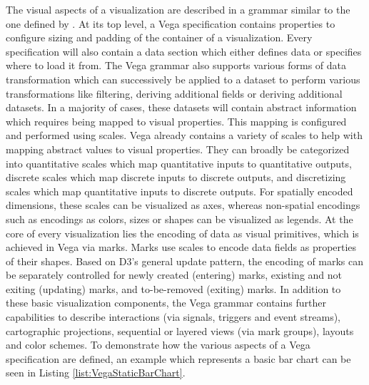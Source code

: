 The visual aspects of a visualization are described in a grammar similar to the one defined by \cite{GrammarOfGraphics}. 
At its top level, a Vega specification contains properties to configure sizing and padding of the container of a visualization. 
Every specification will also contain a data section which either defines data or specifies where to load it from. 
The Vega grammar also supports various forms of data transformation which can successively be applied to a dataset to perform various transformations like filtering, deriving additional fields or deriving additional datasets.
In a majority of cases, these datasets will contain abstract information which requires being mapped to visual properties.
This mapping is configured and performed using scales. 
Vega already contains a variety of scales to help with mapping abstract values to visual properties.
They can broadly be categorized into quantitative scales which map quantitative inputs to quantitative outputs, discrete scales which map discrete inputs to discrete outputs, and discretizing scales which map quantitative inputs to discrete outputs.
For spatially encoded dimensions, these scales can be visualized as axes, whereas non-spatial encodings such as encodings as colors, sizes or shapes can be visualized as legends.
At the core of every visualization lies the encoding of data as visual primitives, which is achieved in Vega via marks.
Marks use scales to encode data fields as properties of their shapes.
Based on D3's general update pattern, the encoding of marks can be separately controlled for newly created (entering) marks, existing and not exiting (updating) marks, and to-be-removed (exiting) marks.  
In addition to these basic visualization components, the Vega grammar contains further capabilities to describe interactions (via signals, triggers and event streams), cartographic projections, sequential or layered views (via mark groups), layouts and color schemes. 
To demonstrate how the various aspects of a Vega specification are defined, an example which represents a basic bar chart can be seen in Listing \ref{list:VegaStaticBarChart}.

\begin{samepage}
 Vega specification of a static bar chart. 
    Demonstrates the principle of data, scales, axes and marks.
  },
]{listings/vega-static-bar-chart.json}
\end{samepage}

